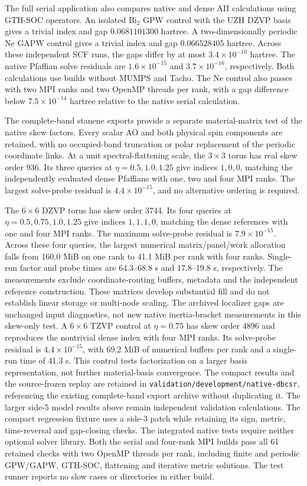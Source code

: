 \documentclass[11pt]{article}
\begin{document}
The full serial application also compares native and dense AII
calculations using GTH-SOC operators. An isolated Bi$_2$ GPW control
with the UZH DZVP basis gives a trivial index and gap
$0.0681101300$ hartree. A two-dimensionally periodic Ne GAPW control
gives a trivial index and gap $0.066528405$ hartree.
Across these independent SCF runs, the gaps differ by at most
$3.4\times10^{-10}$ hartree. The native Pfaffian solve residuals
are $1.6\times10^{-15}$ and $3.7\times10^{-16}$, respectively.
Both calculations use builds without MUMPS and Tacho.
The Ne control also passes with two MPI ranks and two OpenMP threads
per rank, with a gap difference below $7.5\times10^{-14}$ hartree
relative to the native serial calculation.

The complete-band stanene exports provide a separate material-matrix
test of the native skew factors. Every scalar AO and both physical
spin components are retained, with no occupied-band truncation or
polar replacement of the periodic coordinate links. At a unit
spectral-flattening scale, the $3\times3$ torus has real skew order
936. Its three queries at $\eta=0.5,1.0,1.25$ give indices $1,0,0$,
matching the independently evaluated dense Pfaffians with one, two
and four MPI ranks. The largest solve-probe residual is
$4.4\times10^{-15}$, and no alternative ordering is required.

The $6\times6$ DZVP torus has skew order 3744. Its four queries at
$\eta=0.5,0.75,1.0,1.25$ give indices $1,1,1,0$, matching the dense
references with one and four MPI ranks. The maximum solve-probe
residual is $7.9\times10^{-15}$. Across these four queries, the
largest numerical matrix/panel/work allocation falls from 160.0 MiB
on one rank to 41.1 MiB per rank with four ranks. Single-run factor
and probe times are 64.3--68.8 s and 17.8--19.8 s, respectively.
The measurements exclude coordinate-routing buffers, metadata and
the independent reference construction. These matrices develop
substantial fill and do not establish linear storage or multi-node
scaling. The archived localizer gaps are unchanged input diagnostics,
not new native inertia-bracket measurements in this skew-only test.
A $6\times6$ TZVP control at $\eta=0.75$ has skew order 4896
and reproduces the nontrivial dense index with four MPI ranks.
Its solve-probe residual is $4.4\times10^{-15}$, with 69.2 MiB
of numerical buffers per rank and a single-run time of 41.3 s.
This control tests factorization on a larger basis representation,
not further material-basis convergence.
The compact results and the source-frozen replay are retained in
\texttt{validation/development/native-dbcsr}, referencing the existing
complete-band export archive without duplicating it.
The larger side-5 model results above remain independent validation
calculations. The compact regression fixture uses a side-3 patch
while retaining its sign, metric, time-reversal and gap-closing checks.
The integrated native tests require neither optional solver library.
Both the serial and four-rank MPI builds pass all 61 retained checks
with two OpenMP threads per rank, including finite and periodic
GPW/GAPW, GTH-SOC, flattening and iterative metric solutions.
The test runner reports no slow cases or directories in either build.
\end{document}
